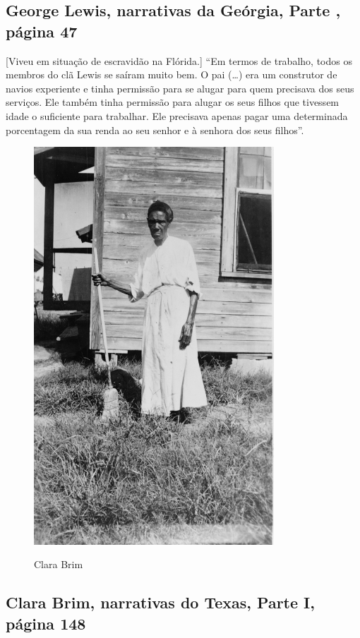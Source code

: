 \subsection{George Lewis, narrativas da Geórgia, Parte , página 47}
\label{ref171}

{[}Viveu em situação de escravidão na Flórida.{]} ``Em termos de trabalho, todos os
membros do clã Lewis se saíram muito bem. O pai (\ldots{}) era um
construtor de navios experiente e tinha permissão para se alugar para
quem precisava dos seus serviços. Ele também tinha permissão para alugar
os seus filhos que tivessem idade o suficiente para trabalhar. Ele
precisava apenas pagar uma determinada porcentagem da sua renda ao seu
senhor e à senhora dos seus filhos''.

\begin{figure}[]
\centering
 \includegraphics[width=90mm]{./imgs/clarabrim_recorte.jpg} \label{img4}
\caption{Clara Brim}
\end{figure}

\subsection{Clara Brim, narrativas do Texas, Parte I, página 148} \label{ref33}

